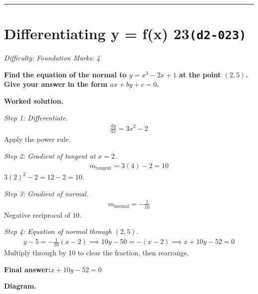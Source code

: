\documentclass[11pt]{article}
\newcommand{\question}[1]{\par\medskip\noindent\textbf{#1}\par}
\begin{document}
\medskip\hrule

\section*{Differentiating y = f(x) 23\quad\small\texttt{(d2-023)}}
\textit{Difficulty: Foundation \quad\textbar\quad Marks: 4}

\question{Find the equation of the normal to \( y = x^3 - 2x + 1 \) at the point \( (2, 5) \). Give your answer in the form \( ax + by + c = 0 \).}

\textbf{Worked solution.}

\textit{Step 1: Differentiate.}
\[\begin{gathered}
\frac{\mathrm{d}y}{\mathrm{d}x} = 3x^2 - 2
\end{gathered}\]
Apply the power rule.

\textit{Step 2: Gradient of tangent at \( x = 2 \).}
\[\begin{gathered}
m_{\text{tangent}} = 3(4) - 2 = 10
\end{gathered}\]
\( 3(2)^2 - 2 = 12 - 2 = 10 \).

\textit{Step 3: Gradient of normal.}
\[\begin{gathered}
m_{\text{normal}} = -\frac{1}{10}
\end{gathered}\]
Negative reciprocal of \( 10 \).

\textit{Step 4: Equation of normal through \( (2, 5) \).}
\[\begin{gathered}
y - 5 = -\tfrac{1}{10}(x - 2) \implies 10y - 50 = -(x - 2) \implies x + 10y - 52 = 0
\end{gathered}\]
Multiply through by 10 to clear the fraction, then rearrange.

\begin{answerbox}
\textbf{Final answer:}\quad \(\displaystyle  x + 10y - 52 = 0 \)
\end{answerbox}
\textbf{Diagram.}
\end{document}
